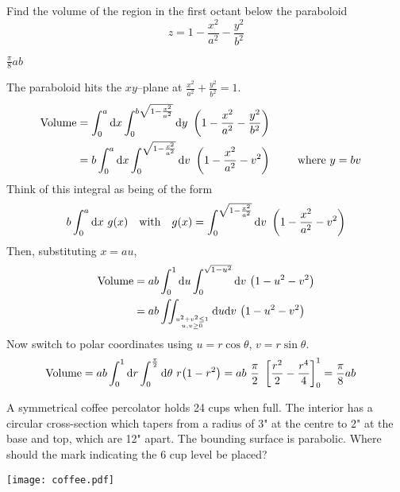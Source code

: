 \begin{question}
Find the volume of the region in the first octant below the 
paraboloid
$$
z=1-\frac{x^2}{a^2}-\frac{y^2}{b^2}
$$
\end{question}

%

\begin{answer}
$\frac{\pi}{8}ab$
\end{answer}

\begin{solution}
The paraboloid hits the $xy$--plane at $\frac{x^2}{a^2}
+\frac{y^2}{b^2}=1$. 
\begin{align*}
\text{Volume}
&=\int_0^a \dee{x}\int_0^{b\sqrt{1-{x^2\over a^2}}} \dee{y}\ 
\left(1-\frac{x^2}{a^2}-\frac{y^2}{b^2}\right) \cr
&=b\int_0^a \dee{x}\int_0^{\sqrt{1-{x^2\over a^2}}} \dee{v}\ 
\left(1-\frac{x^2}{a^2}-v^2\right) \qquad\text{ where $y=bv$}\cr
\end{align*}
Think of this integral as being of the form 
\begin{equation*}
\displaystyle b\int_0^a \dee{x}\ g(x)\quad \text{with}\quad
\displaystyle g(x)=\int_0^{\sqrt{1-{x^2\over a^2}}} \dee{v}\ 
                               \left(1-\frac{x^2}{a^2}-v^2\right)
\end{equation*}
Then, substituting $x=au$,
\begin{align*}
\text{Volume}
&=ab\int_0^1 \dee{u}\int_0^{\sqrt{1-u^2}} \dee{v}\ \big(1-u^2-v^2\big) \\
&=ab\dblInt_{u^2+v^2\le 1\atop u,v\ge 0} \dee{u}  \dee{v}\ 
\big(1-u^2-v^2\big) 
\end{align*}
Now switch to polar coordinates using $u=r\cos\theta$, $v=r\sin\theta$.
\begin{align*}
\text{Volume}
&=ab\int_0^1 \dee{r}\int_0^{\pi\over 2} \dee{\theta}\ r\big(1-r^2\big)
=ab\ \frac{\pi}{2}\ \left[\frac{r^2}{2}-\frac{r^4}{4}\right]_0^1
=\frac{\pi}{8}ab
\end{align*}
\end{solution}

\begin{question}
A symmetrical coffee percolator holds 24 cups when full. The interior has a circular cross-section which tapers from a radius of 3" at the centre to 2" at the base and top, which are 12" apart. The bounding surface is parabolic. Where should the mark indicating the 6 cup level be placed?

\begin{center}
     \texttt{[image: coffee.pdf]}
\end{center}
\end{question}

